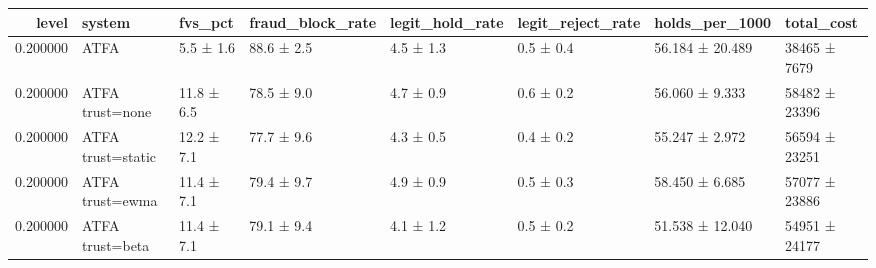 \begin{tabular}{rlllllll}
\toprule
level & system & fvs\_pct & fraud\_block\_rate & legit\_hold\_rate & legit\_reject\_rate & holds\_per\_1000 & total\_cost \\
\midrule
0.200000 & ATFA & 5.5 ± 1.6 & 88.6 ± 2.5 & 4.5 ± 1.3 & 0.5 ± 0.4 & 56.184 ± 20.489 & 38465 ± 7679 \\
0.200000 & ATFA trust=none & 11.8 ± 6.5 & 78.5 ± 9.0 & 4.7 ± 0.9 & 0.6 ± 0.2 & 56.060 ± 9.333 & 58482 ± 23396 \\
0.200000 & ATFA trust=static & 12.2 ± 7.1 & 77.7 ± 9.6 & 4.3 ± 0.5 & 0.4 ± 0.2 & 55.247 ± 2.972 & 56594 ± 23251 \\
0.200000 & ATFA trust=ewma & 11.4 ± 7.1 & 79.4 ± 9.7 & 4.9 ± 0.9 & 0.5 ± 0.3 & 58.450 ± 6.685 & 57077 ± 23886 \\
0.200000 & ATFA trust=beta & 11.4 ± 7.1 & 79.1 ± 9.4 & 4.1 ± 1.2 & 0.5 ± 0.2 & 51.538 ± 12.040 & 54951 ± 24177 \\
\bottomrule
\end{tabular}
